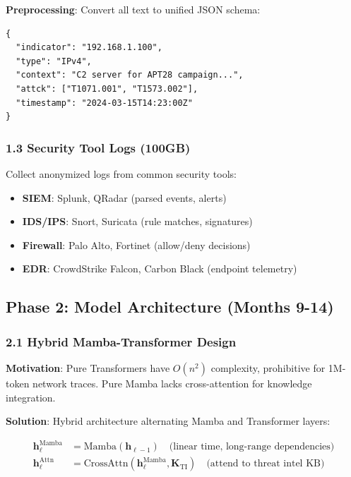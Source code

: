 \documentclass[11pt]{article}
\begin{document}
\textbf{Preprocessing}: Convert all text to unified JSON schema:
\begin{verbatim}
{
  "indicator": "192.168.1.100",
  "type": "IPv4",
  "context": "C2 server for APT28 campaign...",
  "attck": ["T1071.001", "T1573.002"],
  "timestamp": "2024-03-15T14:23:00Z"
}
\end{verbatim}

\subsubsection{1.3 Security Tool Logs (100GB)}

Collect anonymized logs from common security tools:
\begin{itemize}
    \item \textbf{SIEM}: Splunk, QRadar (parsed events, alerts)
    \item \textbf{IDS/IPS}: Snort, Suricata (rule matches, signatures)
    \item \textbf{Firewall}: Palo Alto, Fortinet (allow/deny decisions)
    \item \textbf{EDR}: CrowdStrike Falcon, Carbon Black (endpoint telemetry)
\end{itemize}

\subsection{Phase 2: Model Architecture (Months 9-14)}

\subsubsection{2.1 Hybrid Mamba-Transformer Design}

\textbf{Motivation}: Pure Transformers have $O(n^2)$ complexity, prohibitive for 1M-token network traces. Pure Mamba lacks cross-attention for knowledge integration.

\textbf{Solution}: Hybrid architecture alternating Mamba and Transformer layers:

\begin{equation}
\begin{aligned}
\mathbf{h}_{\ell}^{\text{Mamba}} &= \text{Mamba}(\mathbf{h}_{\ell-1}) \quad \text{(linear time, long-range dependencies)} \\
\mathbf{h}_{\ell}^{\text{Attn}} &= \text{CrossAttn}(\mathbf{h}_{\ell}^{\text{Mamba}}, \mathbf{K}_{\text{TI}}) \quad \text{(attend to threat intel KB)}
\end{aligned}
\end{equation}
\end{document}
